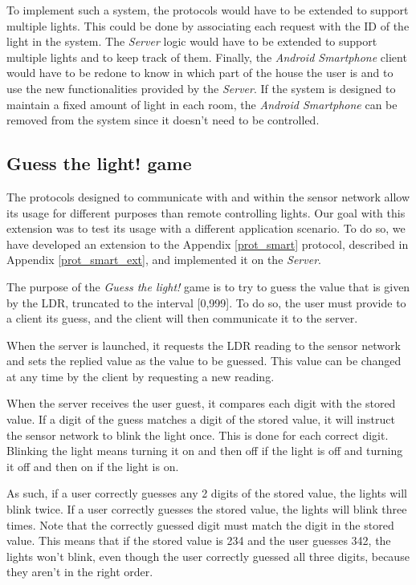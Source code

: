 \documentclass[conference, a4paper]{IEEEtran}
\begin{document}
To implement such a system, the protocols would have to be extended to support multiple lights. This could be done by associating each request with the ID of the light in the system. The \textit{Server} logic would have to be extended to support multiple lights and to keep track of them. Finally, the \textit{Android Smartphone} client would have to be redone to know in which part of the house the user is and to use the new functionalities provided by the \textit{Server}. If the system is designed to maintain a fixed amount of light in each room, the \textit{Android Smartphone} can be removed from the system since it doesn't need to be controlled.

\subsection{Guess the light! game}

The protocols designed to communicate with and within the sensor network allow its usage for different purposes than remote controlling lights. Our goal with this extension was to test its usage with a different application scenario. To do so, we have developed an extension to the Appendix \ref{prot_smart} protocol, described in Appendix \ref{prot_smart_ext}, and implemented it on the \textit{Server}.

The purpose of the \textit{Guess the light!} game is to try to guess the value that is given by the LDR, truncated to the interval [0,999]. To do so, the user must provide to a client its guess, and the client will then communicate it to the server.

When the server is launched, it requests the LDR reading to the sensor network and sets the replied value as the value to be guessed. This value can be changed at any time by the client by requesting a new reading.

When the server receives the user guest, it compares each digit with the stored value. If a digit of the guess matches a digit of the stored value, it will instruct the sensor network to blink the light once. This is done for each correct digit. Blinking the light means turning it on and then off if the light is off and turning it off and then on if the light is on.

As such, if a user correctly guesses any 2 digits of the stored value, the lights will blink twice. If a user correctly guesses the stored value, the lights will blink three times. Note that the correctly guessed digit must match the digit in the stored value. This means that if the stored value is 234 and the user guesses 342, the lights won't blink, even though the user correctly guessed all three digits, because they aren't in the right order.
\end{document}
